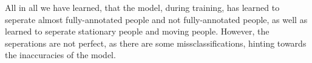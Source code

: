\documentclass[./main.tex]{subfiles}
\begin{document}
\newpage
\noindent All in all we have learned, that the model, during training, has learned to seperate almost fully-annotated people and not fully-annotated people, as well as learned to seperate stationary people and moving people. However, the seperations are not perfect, as there are some missclassifications, hinting towards the inaccuracies of the model.
\end{document}
